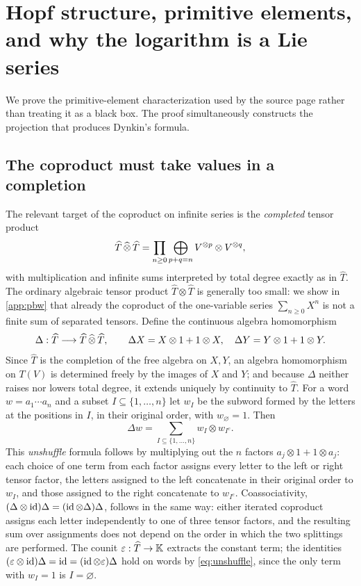 \section{Hopf structure, primitive elements, and why the logarithm is a Lie series}\label{sec:hopf}
We prove the primitive-element characterization used by the source page
rather than treating it as a black box. The proof simultaneously constructs
the projection that produces Dynkin's formula.

\subsection{The coproduct must take values in a completion}
The relevant target of the coproduct on infinite series is the
\emph{completed} tensor product
\[
 \widehat T\,\widehat{\otimes}\,\widehat T
 =\prod_{n\geq0}\bigoplus_{p+q=n}V^{\otimes p}\otimes V^{\otimes q},
\]
with multiplication and infinite sums interpreted by total degree exactly as
in $\widehat T$. The ordinary algebraic tensor product
$\widehat T\otimes\widehat T$ is generally too small: we show in
\cref{app:pbw} that already the coproduct of the one-variable series
$\sum_{n\geq0}X^n$ is not a finite sum of separated tensors. Define the
continuous algebra homomorphism
\begin{equation}\label{eq:coproduct}
 \Delta:\widehat T\longrightarrow\widehat T\,\widehat{\otimes}\,\widehat T,
 \qquad
 \Delta X=X\otimes1+1\otimes X,\quad
 \Delta Y=Y\otimes1+1\otimes Y.
\end{equation}
Since $\widehat T$ is the completion of the free algebra on $X,Y$, an
algebra homomorphism on $T(V)$ is determined freely by the images of $X$ and
$Y$; and because $\Delta$ neither raises nor lowers total degree, it
extends uniquely by continuity to $\widehat T$. For a word
$w=a_1\cdots a_n$ and a subset $I\subseteq\{1,\ldots,n\}$ let $w_I$ be the
subword formed by the letters at the positions in $I$, in their original
order, with $w_\varnothing=1$. Then
\begin{equation}\label{eq:unshuffle}
 \Delta w=\sum_{I\subseteq\{1,\ldots,n\}}w_I\otimes w_{I^c}.
\end{equation}
This \emph{unshuffle} formula follows by multiplying out the $n$ factors
$a_j\otimes1+1\otimes a_j$: each choice of one term from each factor
assigns every letter to the left or right tensor factor, the letters
assigned to the left concatenate in their original order to $w_I$, and those
assigned to the right concatenate to $w_{I^c}$. Coassociativity,
$(\Delta\otimes\operatorname{id})\Delta=(\operatorname{id}\otimes\Delta)\Delta$, follows in the same way:
either iterated coproduct assigns each letter independently to one of three
tensor factors, and the resulting sum over assignments does not depend on
the order in which the two splittings are performed. The counit
$\varepsilon:\widehat T\to\mathbb{K}$ extracts the constant term; the identities
$(\varepsilon\otimes\operatorname{id})\Delta=\operatorname{id}=(\operatorname{id}\otimes\varepsilon)\Delta$ hold on words by
\eqref{eq:unshuffle}, since the only term with $w_I=1$ is $I=\varnothing$.

